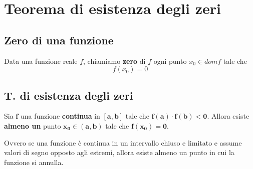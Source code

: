 \documentclass{book}
\begin{document}
\section{Teorema di esistenza degli zeri}
\begin{definition}
    \subsection{Zero di una funzione}
    Data una funzione reale \(f\), chiamiamo \textbf{zero} di \(f\) ogni punto \(x_0 \in dom f\) tale che \[f(x_0) = 0\]
\end{definition}

\begin{theorem}
    \subsection{T. di esistenza degli zeri}
    Sia \(\mathbf{f}\) una funzione \textbf{continua} in \(\mathbf{[a, b]}\) tale che \(\mathbf{f(a) \cdot f(b) < 0}\). Allora esiste \textbf{almeno un} punto \(\mathbf{x_0 \in (a, b)}\) tale che \(\mathbf{f(x_0) = 0}\).

    \noindent Ovvero se una funzione è continua in un intervallo chiuso e limitato e assume valori di segno opposto agli estremi, allora esiste almeno un punto in cui la funzione si annulla.
\end{theorem}
\end{document}
